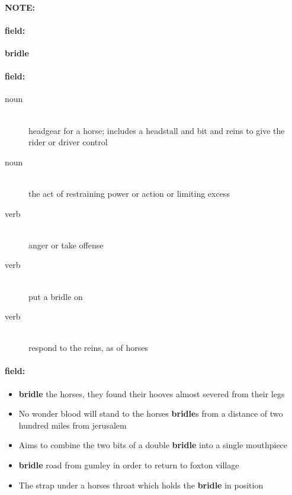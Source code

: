 \documentclass[12pt]{article}
\newenvironment{note}{\paragraph{NOTE:}}{}
\newenvironment{field}{\paragraph{field:}}{}
\begin{document}
\begin{note}
\begin{field}
\textbf{\large bridle}
\end{field}


\begin{field}
\begin{description}
\item[noun] \hfill \\ 
headgear for a horse; includes a headstall and bit and reins to give the rider or driver control

\item[noun] \hfill \\ 
the act of restraining power or action or limiting excess

\item[verb] \hfill \\ 
anger or take offense

\item[verb] \hfill \\ 
put a bridle on

\item[verb] \hfill \\ 
respond to the reins, as of horses

\end{description}
\end{field}

\begin{field}
\begin{itemize}
\item \textbf{bridle} the horses, they found their hooves almost severed from their legs
\item No wonder blood will stand to the horses \textbf{bridle}s from a distance of two hundred miles from jerusalem
\item Aims to combine the two bits of a double \textbf{bridle} into a single mouthpiece
\item \textbf{bridle} road from gumley in order to return to foxton village
\item The strap under a horses throat which holds the \textbf{bridle} in position
\end{itemize}
\end{field}
\end{note}
\end{document}
